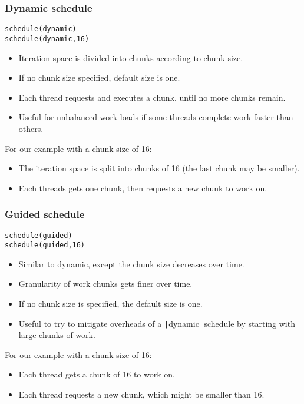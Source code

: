 \documentclass{beamer}
\begin{document}
\begin{frame}[fragile]
\frametitle{Dynamic schedule}
\begin{verbatim}
schedule(dynamic)
schedule(dynamic,16)
\end{verbatim}

\begin{itemize}
  \item Iteration space is divided into chunks according to chunk size.
  \item If no chunk size specified, default size is one.
  \item Each thread requests and executes a chunk, until no more chunks remain.
  \item Useful for unbalanced work-loads if some threads complete work faster than others.
\end{itemize}

For our example with a chunk size of 16:
\begin{itemize}
  \item The iteration space is split into chunks of 16 (the last chunk may be smaller).
  \item Each threads gets one chunk, then requests a new chunk to work on.
\end{itemize}

\end{frame}

\begin{frame}[fragile]
\frametitle{Guided schedule}
\begin{verbatim}
schedule(guided)
schedule(guided,16)
\end{verbatim}

\begin{itemize}
  \item Similar to dynamic, except the chunk size decreases over time.
  \item Granularity of work chunks gets finer over time.
  \item If no chunk size is specified, the default size is one.
  \item Useful to try to mitigate overheads of a \texttt|dynamic| schedule by starting with large chunks of work.
\end{itemize}

For our example with a chunk size of 16:
\begin{itemize}
  \item Each thread gets a chunk of 16 to work on.
  \item Each thread requests a new chunk, which might be smaller than 16.
\end{itemize}

\end{frame}
\end{document}
